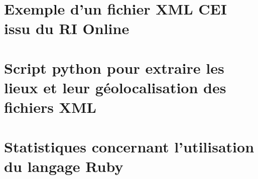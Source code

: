 \documentclass[a4paper,12pt,twoside]{book}
\begin{document}
        \chapter[Schéma XML CEI]{Exemple d'un fichier XML CEI issu du RI Online}
            
        
	\chapter[Extraction des lieux]{Script python pour extraire les lieux et leur géolocalisation des fichiers XML}
            

        \chapter{Statistiques concernant l'utilisation du langage Ruby}
            
	
	\backmatter


 \listoffigures


	\tableofcontents
	
\end{document}
